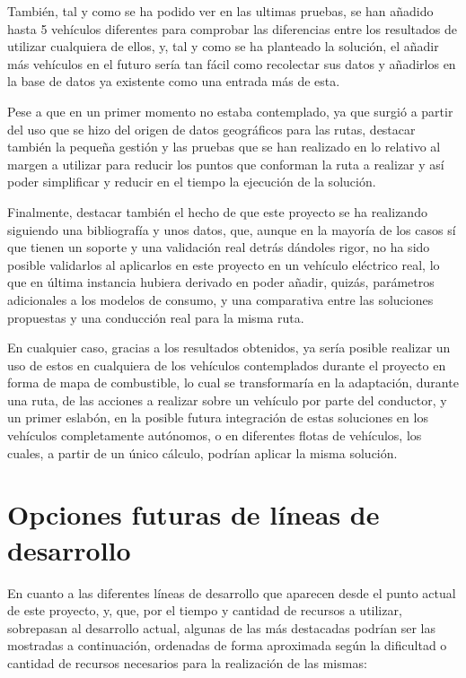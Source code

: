 \documentclass[11pt,spanish,listoffigures,listoftables]{tfgetsinf}
\begin{document}
También, tal y como se ha podido ver en las ultimas pruebas, se han añadido hasta 5 vehículos diferentes para comprobar las diferencias entre los resultados de utilizar cualquiera de ellos, y, tal y como se ha planteado la solución, el añadir más vehículos en el futuro sería tan fácil como recolectar sus datos y añadirlos en la base de datos ya existente como una entrada más de esta.

Pese a que en un primer momento no estaba contemplado, ya que surgió a partir del uso que se hizo del origen de datos geográficos para las rutas, destacar también la pequeña gestión y las pruebas que se han realizado en lo relativo al margen a utilizar para reducir los puntos que conforman la ruta a realizar y así poder simplificar y reducir en el tiempo la ejecución de la solución.

Finalmente, destacar también el hecho de que este proyecto se ha realizando siguiendo una bibliografía y unos datos, que, aunque en la mayoría de los casos sí que tienen un soporte y una validación real detrás dándoles rigor, no ha sido posible validarlos al aplicarlos en este proyecto en un vehículo eléctrico real, lo que en última instancia hubiera derivado en poder añadir, quizás, parámetros adicionales a los modelos de consumo, y una comparativa entre las soluciones propuestas y una conducción real para la misma ruta.

En cualquier caso, gracias a los resultados obtenidos, ya sería posible realizar un uso de estos en cualquiera de los vehículos contemplados durante el proyecto en forma de mapa de combustible, lo cual se transformaría en la adaptación, durante una ruta, de las acciones a realizar sobre un vehículo por parte del conductor, y un primer eslabón, en la posible futura integración de estas soluciones en los vehículos completamente autónomos, o en diferentes flotas de vehículos, los cuales, a partir de un único cálculo, podrían aplicar la misma solución.

\section{Opciones futuras de líneas de desarrollo}
En cuanto a las diferentes líneas de desarrollo que aparecen desde el punto actual de este proyecto, y, que, por el tiempo y cantidad de recursos a utilizar, sobrepasan al desarrollo actual, algunas de las más destacadas podrían ser las mostradas a continuación, ordenadas de forma aproximada según la dificultad o cantidad de recursos necesarios para la realización de las mismas:
\end{document}
